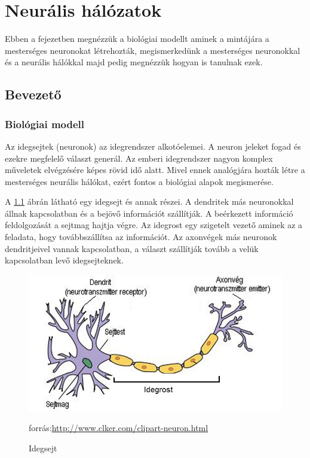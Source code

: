 \chapter{Neurális hálózatok}\label{ch:INTRO}

\begin{osszefoglal}
Ebben a fejezetben megnézzük a biológiai modellt aminek a mintájára a mesterséges neuronokat létrehozták, megismerkedünk a mesterséges neuronokkal és a neurális hálókkal majd pedig megnézzük hogyan is tanulnak ezek.
\end{osszefoglal}

\section{Bevezető}
\subsection{Biológiai modell}

Az idegsejtek (neuronok) az idegrendszer alkotóelemei. A neuron jeleket fogad és ezekre megfelelő választ generál. Az emberi idegrendszer nagyon komplex műveletek elvégzésére képes rövid idő alatt. Mivel ennek analógjára hozták létre a mesterséges neurális hálókat, ezért fontos a biológiai alapok megismerése.

A \ref{fig:idegsejt} ábrán látható egy idegsejt és annak részei. A dendritek más neuronokkal állnak kapcsolatban és a bejövő információt szállítják. A beérkezett információ feldolgozását a sejtmag hajtja végre. Az idegrost egy szigetelt vezető aminek az a feladata, hogy továbbszállítsa az információt. Az axonvégek más neuronok dendritjeivel vannak kapcsolatban, a választ szállítják tovább a velük kapcsolatban levő idegsejteknek. 


\begin{figure}[h]
\centering

\includegraphics[scale=0.5]{images/idegsejt}
\caption{Idegsejt}
\small forrás:\url{http://www.clker.com/clipart-neuron.html}


\label{fig:idegsejt}
\end{figure}


